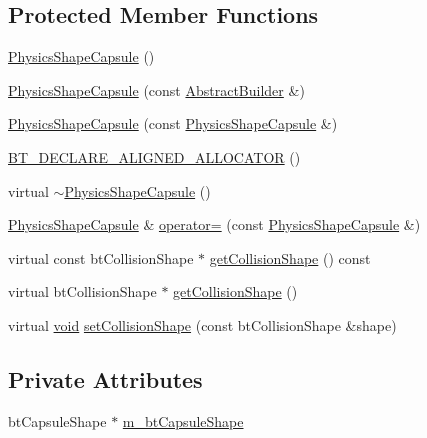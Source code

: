 \subsection*{Protected Member Functions}
\begin{DoxyCompactItemize}
\item 
\mbox{\hyperlink{classnjli_1_1_physics_shape_capsule_aa5faa50ab0e935dc91f7000b0c36d8b0}{Physics\+Shape\+Capsule}} ()
\item 
\mbox{\hyperlink{classnjli_1_1_physics_shape_capsule_aaca36e4f925aee078532dbccdee02eee}{Physics\+Shape\+Capsule}} (const \mbox{\hyperlink{classnjli_1_1_abstract_builder}{Abstract\+Builder}} \&)
\item 
\mbox{\hyperlink{classnjli_1_1_physics_shape_capsule_aa8fc0e2d8af232c76a7b6295157717b4}{Physics\+Shape\+Capsule}} (const \mbox{\hyperlink{classnjli_1_1_physics_shape_capsule}{Physics\+Shape\+Capsule}} \&)
\item 
\mbox{\hyperlink{classnjli_1_1_physics_shape_capsule_aa5938a5c85d0908c108190e0dbf35f8f}{B\+T\+\_\+\+D\+E\+C\+L\+A\+R\+E\+\_\+\+A\+L\+I\+G\+N\+E\+D\+\_\+\+A\+L\+L\+O\+C\+A\+T\+OR}} ()
\item 
virtual \mbox{\hyperlink{classnjli_1_1_physics_shape_capsule_a3e2d57b5b55c9929b544ef0c3eca471d}{$\sim$\+Physics\+Shape\+Capsule}} ()
\item 
\mbox{\hyperlink{classnjli_1_1_physics_shape_capsule}{Physics\+Shape\+Capsule}} \& \mbox{\hyperlink{classnjli_1_1_physics_shape_capsule_a08cb2f051b3a3852425a1ca9528b3f8b}{operator=}} (const \mbox{\hyperlink{classnjli_1_1_physics_shape_capsule}{Physics\+Shape\+Capsule}} \&)
\item 
virtual const bt\+Collision\+Shape $\ast$ \mbox{\hyperlink{classnjli_1_1_physics_shape_capsule_a1a319c965b9b504353759dd8729944e1}{get\+Collision\+Shape}} () const
\item 
virtual bt\+Collision\+Shape $\ast$ \mbox{\hyperlink{classnjli_1_1_physics_shape_capsule_a7d13876272eca6b0fd5d7f04392b134e}{get\+Collision\+Shape}} ()
\item 
virtual \mbox{\hyperlink{_thread_8h_af1e856da2e658414cb2456cb6f7ebc66}{void}} \mbox{\hyperlink{classnjli_1_1_physics_shape_capsule_a8f520536b574f254ba6635ab2fe644cc}{set\+Collision\+Shape}} (const bt\+Collision\+Shape \&shape)
\end{DoxyCompactItemize}
\subsection*{Private Attributes}
\begin{DoxyCompactItemize}
\item 
bt\+Capsule\+Shape $\ast$ \mbox{\hyperlink{classnjli_1_1_physics_shape_capsule_a5f0db680ed20e467ade57cb3c40b96a8}{m\+\_\+bt\+Capsule\+Shape}}
\end{DoxyCompactItemize}
